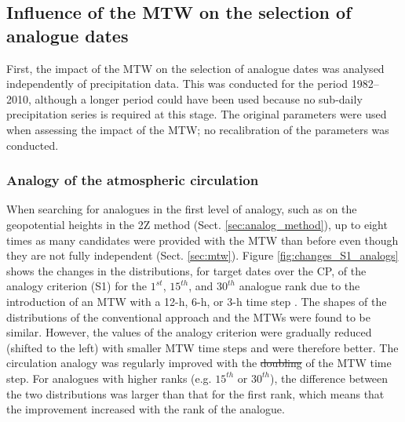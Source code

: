 \documentclass[hess, manuscript]{copernicus}
\providecommand{\DIFadd}[1]{{\protect\color{blue}\uwave{#1}}} %
\providecommand{\DIFdel}[1]{{\protect\color{red}\sout{#1}}}                      %
\providecommand{\DIFaddbegin}{} %
\providecommand{\DIFaddend}{} %
\providecommand{\DIFdelbegin}{} %
\providecommand{\DIFdelend}{} %
\begin{document}
	\subsection{Influence of the MTW on the selection of analogue dates}
	\label{sec:influence_analogue_dates}

	First, the impact of the MTW on the selection of analogue dates was analysed independently of precipitation data. This was conducted for the period 1982--2010, although a longer period could have been used because no sub-daily precipitation series is required at this stage. The original parameters were used when assessing the impact of the MTW; no recalibration of the parameters was conducted.

	\subsubsection{Analogy of the atmospheric circulation}
	\label{sec:changes_analogy_circul}

	When searching for analogues in the first level of analogy, such as on the geopotential heights in the 2Z method (Sect. \ref{sec:analog_method}), up to eight times as many candidates were provided with the MTW than before even though they are not fully independent (Sect. \ref{sec:mtw}). Figure \ref{fig:changes_S1_analogs} shows the changes in the distributions, for target dates over the CP, of the analogy criterion (S1) for the $1^{st}$, $15^{th}$, and $30^{th}$ analogue rank due to the introduction of an MTW with a 12-h, 6-h, or 3-h time step \DIFaddbegin \DIFadd{respectively}\DIFaddend . The shapes of the distributions of the conventional approach and the MTWs were found to be similar. However, the values of the analogy criterion were gradually reduced (shifted to the left) with smaller MTW time steps and were therefore better. The circulation analogy was regularly improved with the \DIFdelbegin \DIFdel{doubling }\DIFdelend \DIFaddbegin \DIFadd{halving }\DIFaddend of the MTW time step. For analogues with higher ranks (e.g. $15^{th}$ or $30^{th}$), the difference between the two distributions was larger than that for the first rank, which means that the improvement increased with the rank of the analogue. 
\end{document}
